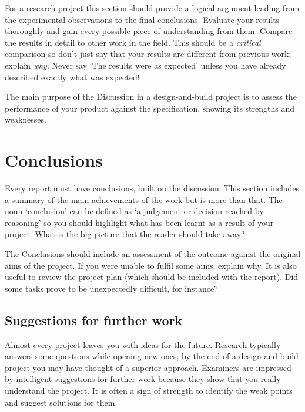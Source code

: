 \documentclass[a4paper,12pt]{article}
\begin{document}
For a research project this section should provide a logical argument leading from the experimental observations to the final conclusions. Evaluate your results thoroughly and gain every possible piece of understanding from them. Compare the results in detail to other work in the field. This should be a \emph{critical} comparison so don't just say that your results are different from previous work; explain \emph{why}. Never say `The results were as expected' unless you have already described exactly what was expected!

The main purpose of the Discussion in a design-and-build project is to assess the performance of your product against the specification, showing its strengths and weaknesses.


\section{Conclusions}

Every report must have conclusions, built on the discussion. This section includes a summary of the main achievements of the work but is more than that. The noun `conclusion' can be defined as `a judgement or decision reached by reasoning' \cite{oupconc} so you should highlight what has been learnt as a result of your project. What is the big picture that the reader should take away? 

The Conclusions should include an assessment of the outcome against the original aims of the project. If you were unable to fulfil some aims, explain why. It is also useful to review the project plan (which should be included with the report). Did some tasks prove to be unexpectedly difficult, for instance?

\subsection{Suggestions for further work}

Almost every project leaves you with ideas for the future. Research typically answers some questions while opening new ones; by the end of a design-and-build project you may have thought of a superior approach. Examiners are impressed by intelligent suggestions for further work because they show that you really understand the project. It is often a sign of strength to identify the weak points and suggest solutions for them.
\end{document}
